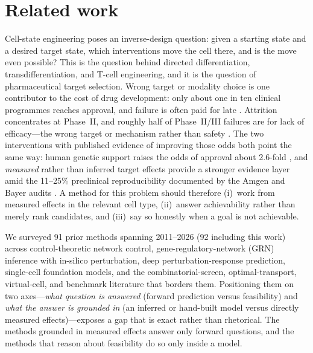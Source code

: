 \section{Related work}
\label{sec:related}

Cell-state engineering poses an inverse-design question: given a starting state and a
desired target state, which interventions move the cell there, and is the move even
possible? This is the question behind directed differentiation, transdifferentiation, and
T-cell engineering, and it is the question of pharmaceutical target selection. Wrong target
or modality choice is one contributor to the cost of drug development: only about one in ten
clinical programmes reaches approval, and failure is often paid for late
\citep{Minikel2024,WongSiahLo2019}. Attrition concentrates
at Phase~II, and roughly half of Phase~II/III failures are for lack of efficacy---the
wrong target or mechanism rather than safety \citep{Harrison2016}. The two interventions
with published evidence of improving those odds both point the same way: human genetic
support raises the odds of approval about 2.6-fold \citep{Minikel2024,Nelson2015}, and
\emph{measured} rather than inferred target effects provide a stronger evidence layer amid the
11--25\% preclinical reproducibility documented by the Amgen and Bayer audits
\citep{BegleyEllis2012,Prinz2011}. A method for this problem should therefore (i)~work from
measured effects in the relevant cell type, (ii)~answer achievability rather than merely
rank candidates, and (iii)~say so honestly when a goal is not achievable.

We surveyed 91 prior methods spanning 2011--2026 (92 including this work) across
control-theoretic network control,
gene-regulatory-network (GRN) inference with in-silico perturbation, deep
perturbation-response prediction, single-cell foundation models, and the
combinatorial-screen, optimal-transport, virtual-cell, and benchmark literature that
borders them. Positioning them on two axes---\emph{what question is answered} (forward
prediction versus feasibility) and \emph{what the answer is grounded in} (an inferred or
hand-built model versus directly measured effects)---exposes a gap that is exact rather
than rhetorical. The methods grounded in measured effects answer only forward questions,
and the methods that reason about feasibility do so only inside a model.


